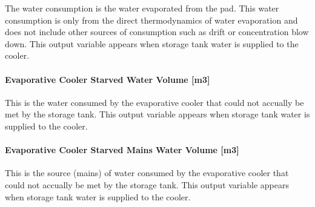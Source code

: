 The water consumption is the water evaporated from the pad. This water consumption is only from the direct thermodynamics of water evaporation and does not include other sources of consumption such as drift or concentration blow down. This output variable appears when storage tank water is supplied to the cooler.

\paragraph{Evaporative Cooler Starved Water Volume {[}m3{]}}\label{evaporative-cooler-starved-water-volume-m3-4}

This is the water consumed by the evaporative cooler that could not accually be met by the storage tank. This output variable appears when storage tank water is supplied to the cooler.

\paragraph{Evaporative Cooler Starved Mains Water Volume {[}m3{]}}\label{evaporative-cooler-starved-mains-water-volume-m3-4}

This is the source (mains) of water consumed by the evaporative cooler that could not accually be met by the storage tank. This output variable appears when storage tank water is supplied to the cooler.